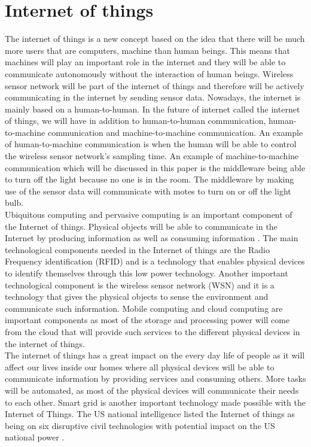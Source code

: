 \documentclass[conference]{IEEEtran}
\begin{document}
\section{Internet of things}
The internet of things is a new concept based on the idea that there will be much more users that are computers, machine than human beings. This means that machines will play an important role in the internet and they will be able to communicate autonomously without the interaction of human beings. Wireless sensor network will be part of the internet of things and therefore will be actively communicating in the internet by sending sensor data. Nowadays, the internet is mainly based on a human-to-human. In the future of internet called the internet of things, we will have in addition to human-to-human communication, human-to-machine communication and machine-to-machine communication. An example of human-to-machine communication is when the human will be able to control the wireless sensor network's sampling time. An example of machine-to-machine communication which will be discussed in this paper is the middleware being able to turn off the light because no one is in the room. The middleware by making use of the sensor data will communicate with motes to turn on or off the light bulb. \\
Ubiquitous computing and pervasive computing is an important component of the Internet of things. Physical objects will be able to communicate in the Internet by producing information as well as consuming information \cite{ref9}. The main technological components needed in the Internet of things are the Radio Frequency identification (RFID) and is a technology that enables physical devices to identify themselves through this low power technology. Another important technological component is the wireless sensor network (WSN) and it is a technology that gives the physical objects to sense the environment and communicate such information. Mobile computing and cloud computing are important components as most of the storage and processing power will come from the cloud that will provide such services to the different physical devices in the internet of things. \\
The internet of things has a great impact on the every day life of people as it will affect our lives inside our homes where all physical devices will be able to communicate information by providing services and consuming others. More tasks will be automated, as most of the physical devices will communicate their needs to each other. Smart grid is another important technology made possible with the Internet of Things. The US national intelligence listed the Internet of things as being on six disruptive civil technologies with potential impact on the US national power \cite{ref10}. \\
\end{document}
